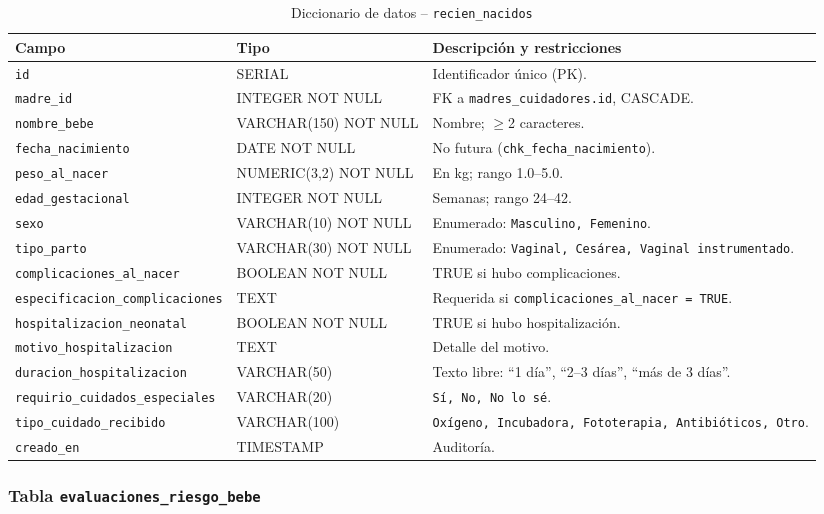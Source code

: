 \documentclass[12pt,letterpaper]{article}
\begin{document}
\begin{longtable}{p{}p{}p{}}
\caption{Diccionario de datos -- \texttt{recien\_nacidos}}\\\toprule
\textbf{Campo} & \textbf{Tipo} & \textbf{Descripción y restricciones} \\\midrule
\endhead
\texttt{id} & SERIAL & Identificador único (PK).\\\hline
\texttt{madre\_id} & INTEGER NOT NULL & FK a \texttt{madres\_cuidadores.id}, CASCADE.\\\hline
\texttt{nombre\_bebe} & VARCHAR(150) NOT NULL & Nombre; $\geq$2 caracteres.\\\hline
\texttt{fecha\_nacimiento} & DATE NOT NULL & No futura (\texttt{chk\_fecha\_nacimiento}).\\\hline
\texttt{peso\_al\_nacer} & NUMERIC(3,2) NOT NULL & En kg; rango 1.0--5.0.\\\hline
\texttt{edad\_gestacional} & INTEGER NOT NULL & Semanas; rango 24--42.\\\hline
\texttt{sexo} & VARCHAR(10) NOT NULL & Enumerado: \texttt{Masculino, Femenino}.\\\hline
\texttt{tipo\_parto} & VARCHAR(30) NOT NULL & Enumerado: \texttt{Vaginal, Cesárea, Vaginal instrumentado}.\\\hline
\texttt{complicaciones\_al\_nacer} & BOOLEAN NOT NULL & TRUE si hubo complicaciones.\\\hline
\texttt{especificacion\_complicaciones} & TEXT & Requerida si \texttt{complicaciones\_al\_nacer = TRUE}.\\\hline
\texttt{hospitalizacion\_neonatal} & BOOLEAN NOT NULL & TRUE si hubo hospitalización.\\\hline
\texttt{motivo\_hospitalizacion} & TEXT & Detalle del motivo.\\\hline
\texttt{duracion\_hospitalizacion} & VARCHAR(50) & Texto libre: ``1 día'', ``2--3 días'', ``más de 3 días''.\\\hline
\texttt{requirio\_cuidados\_especiales} & VARCHAR(20) & \texttt{Sí, No, No lo sé}.\\\hline
\texttt{tipo\_cuidado\_recibido} & VARCHAR(100) & \texttt{Oxígeno, Incubadora, Fototerapia, Antibióticos, Otro}.\\\hline
\texttt{creado\_en} & TIMESTAMP & Auditoría.\\\bottomrule
\end{longtable}

\subsubsection{Tabla \texttt{evaluaciones\_riesgo\_bebe}}
\end{document}
